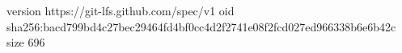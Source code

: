 version https://git-lfs.github.com/spec/v1
oid sha256:bacd799bd4c27bec29464fd4bf0cc4d2f2741e08f2fcd027ed966338b6e6b42c
size 696

